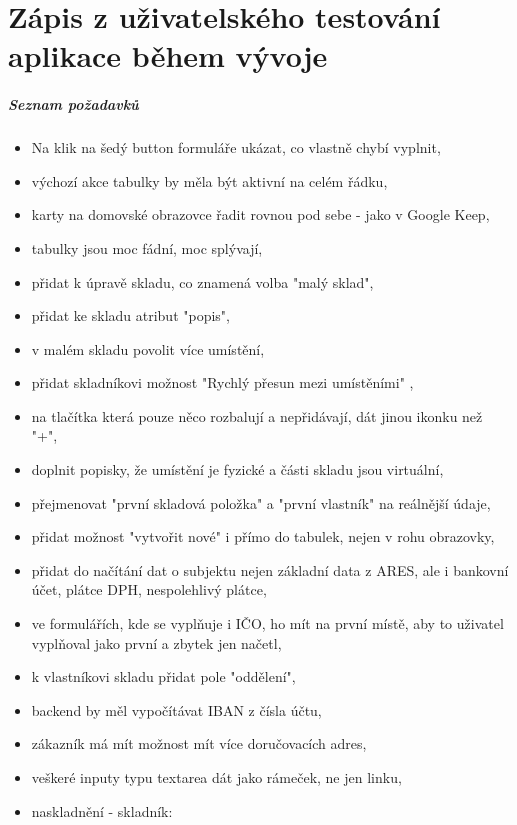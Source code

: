 \chapter{Zápis z uživatelského testování aplikace během vývoje} \label{ap:testing_notes}

\paragraph{Seznam požadavků}

\begin{itemize}
	\item Na klik na šedý button formuláře ukázat, co vlastně chybí vyplnit,
	\item výchozí akce tabulky by měla být aktivní na celém řádku,
	\item karty na domovské obrazovce řadit rovnou pod sebe - jako v Google Keep,
	\item tabulky jsou moc fádní, moc splývají,
	\item přidat k úpravě skladu, co znamená volba "malý sklad",
	\item přidat ke skladu atribut "popis",
	\item v malém skladu povolit více umístění,
	\item přidat skladníkovi možnost "Rychlý přesun mezi umístěními" ,
	\item na tlačítka která pouze něco rozbalují a nepřidávají, dát jinou ikonku než "+",
	\item doplnit popisky, že umístění je fyzické a části skladu jsou virtuální,
	\item přejmenovat "první skladová položka" a "první vlastník" na reálnější údaje,
	\item přidat možnost "vytvořit nové" i přímo do tabulek, nejen v rohu obrazovky,
	\item přidat do načítání dat o subjektu nejen základní data z ARES, ale i bankovní účet, plátce DPH, nespolehlivý plátce,
	\item ve formulářích, kde se vyplňuje i IČO, ho mít na první místě, aby to uživatel vyplňoval jako první a zbytek jen načetl,
	\item k vlastníkovi skladu přidat pole "oddělení",
	\item backend by měl vypočítávat IBAN z čísla účtu,
	\item zákazník má mít možnost mít více doručovacích adres,
	\item veškeré inputy typu textarea dát jako rámeček, ne jen linku,
	\item naskladnění - skladník:

\end{itemize}

